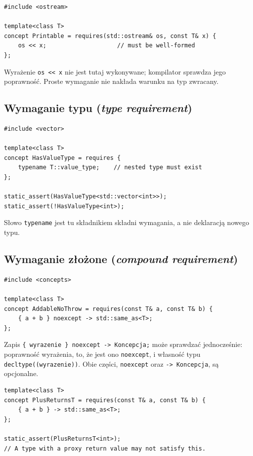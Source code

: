 \begin{lstlisting}
#include <ostream>

template<class T>
concept Printable = requires(std::ostream& os, const T& x) {
    os << x;                    // must be well-formed
};
\end{lstlisting}

Wyrażenie \texttt{os << x}
nie jest tutaj wykonywane; kompilator sprawdza jego poprawność.
Proste wymaganie nie nakłada warunku na typ zwracany.

\subsection{Wymaganie typu (\textit{type requirement})}

\begin{lstlisting}
#include <vector>

template<class T>
concept HasValueType = requires {
    typename T::value_type;    // nested type must exist
};

static_assert(HasValueType<std::vector<int>>);
static_assert(!HasValueType<int>);
\end{lstlisting}

Słowo \texttt{typename} jest tu składnikiem składni wymagania,
a nie deklaracją nowego typu.

\subsection{Wymaganie złożone (\textit{compound requirement})}

\begin{lstlisting}
#include <concepts>

template<class T>
concept AddableNoThrow = requires(const T& a, const T& b) {
    { a + b } noexcept -> std::same_as<T>;
};
\end{lstlisting}

Zapis \texttt{\{ wyrazenie \} noexcept -> Koncepcja;}
może sprawdzać jednocześnie: poprawność wyrażenia,
to, że jest ono \texttt{noexcept}, i własność typu
\texttt{decltype((wyrazenie))}. Obie części, \texttt{noexcept}
oraz \texttt{-> Koncepcja}, są opcjonalne.

\begin{lstlisting}
template<class T>
concept PlusReturnsT = requires(const T& a, const T& b) {
    { a + b } -> std::same_as<T>;
};

static_assert(PlusReturnsT<int>);
// A type with a proxy return value may not satisfy this.
\end{lstlisting}

